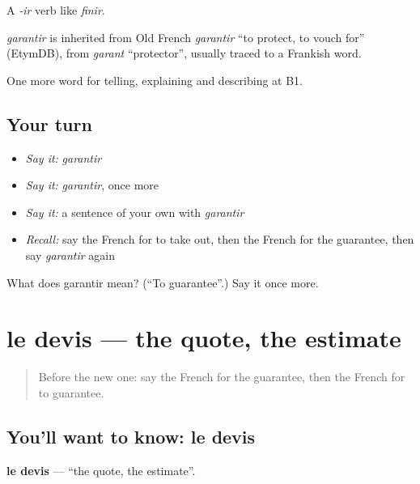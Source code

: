 A \emph{-ir} verb like \emph{finir}.

\begin{cousinweb}
\emph{garantir} is inherited from Old French \emph{garantir} \textquotedblleft{}to protect, to vouch for\textquotedblright{} (EtymDB), from \emph{garant} \textquotedblleft{}protector\textquotedblright{}, usually traced to a Frankish word.
\end{cousinweb}

\begin{grammarlens}[title={What you've built}]
One more word for telling, explaining and describing at B1.
\end{grammarlens}

\subsection*{Your turn}
\begin{itemize}
\raggedright
  \item \emph{Say it:} \emph{garantir}
  \item \emph{Say it:} \emph{garantir}, once more
  \item \emph{Say it:} a sentence of your own with \emph{garantir}
  \item \emph{Recall:} say the French for to take out, then the French for the guarantee, then say \emph{garantir} again
\end{itemize}

\begin{tcolorbox}[breakable,colback=teal!4,colframe=teal!35!black,title={Before you move on}]
What does garantir mean? (\textquotedblleft{}To guarantee\textquotedblright{}.) Say it once more.
\end{tcolorbox}
\section[le devis]{le devis — the quote, the estimate}

\label{lesson:FR-C393-devis}



\begin{quote}
Before the new one: say the French for the guarantee, then the French for to guarantee.
\end{quote}

\subsection*{You'll want to know: le devis}
\textbf{le devis} — \textquotedblleft{}the quote, the estimate\textquotedblright{}.

